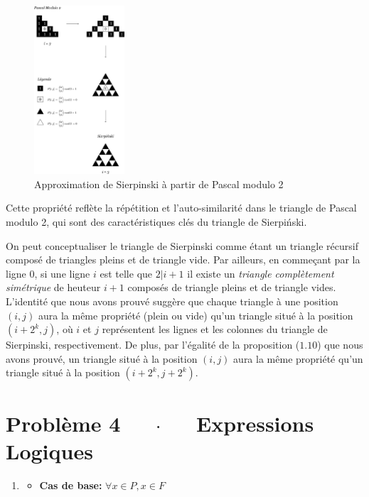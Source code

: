 \documentclass[16pt]{report}
\begin{document}
\begin{multicols*}{2}
        \begin{figure}[H]
            \includegraphics[width=0.3\textwidth]{PascalModulo2.jpg}
            \caption{Approximation de Sierpinski à partir de Pascal modulo 2}
        \end{figure}
        



        Cette propriété reflète la répétition et l'auto-similarité dans le triangle de Pascal modulo 2, 
        qui sont des caractéristiques clés du triangle de Sierpiński.

        On peut conceptualiser le triangle de Sierpinski comme étant un triangle récursif composé de triangles 
        pleins et de triangle vide. Par ailleurs, en commeçant par la ligne 0, 
        si une ligne $i$ est telle que $2|i + 1$  il existe un \textit{triangle complètement simétrique} 
        de heuteur $i + 1$ composés de triangle pleins et de triangle vides. L'identité que nous avons 
        prouvé suggère que chaque triangle à une position $(i,j)$ aura la même propriété 
        (plein ou vide) qu'un triangle situé à la position $(i + 2^k, j)$, où $i$ et $j$ représentent les 
        lignes et les colonnes du triangle de Sierpinski, respectivement. 
        De plus, par l'égalité de la proposition ($1.10$) 
        que nous avons prouvé, un triangle situé à la position $(i, j)$ aura la même propriété qu'un triangle 
        situé à la position $(i + 2^k, j + 2^k)$. 

\section*{Problème 4 $\quad$ $\cdot$  $\quad$ Expressions Logiques}
        \begin{enumerate}
            \item 
            \begin{itemize}
                \item \textbf{Cas de base:} $\forall x \in P, x \in F$
                

\end{itemize}
\end{enumerate}
\end{multicols*}
\end{document}
